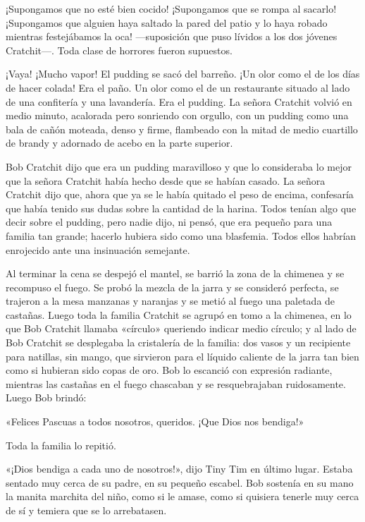 \documentclass{novela}
\begin{document}
 ¡Supongamos que no esté bien cocido! ¡Supongamos que se rompa al sacarlo! ¡Supongamos que alguien haya saltado la pared del patio y lo haya robado mientras festejábamos la oca! ---suposición que puso lívidos a los dos jóvenes Cratchit---. Toda clase de horrores fueron supuestos.

 ¡Vaya! ¡Mucho vapor! El pudding se sacó del barreño. ¡Un olor como el de los días de hacer colada! Era el paño. Un olor como el de un restaurante situado al lado de una confitería y una lavandería. Era el pudding. La señora Cratchit volvió en medio minuto, acalorada pero sonriendo con orgullo, con un pudding como una bala de cañón moteada, denso y firme, flambeado con la mitad de medio cuartillo de brandy y adornado de acebo en la parte superior.

 Bob Cratchit dijo que era un pudding maravilloso y que lo consideraba lo mejor que la señora Cratchit había hecho desde que se habían casado. La señora Cratchit dijo que, ahora que ya se le había quitado el peso de encima, confesaría que había tenido sus dudas sobre la cantidad de la harina. Todos tenían algo que decir sobre el pudding, pero nadie dijo, ni pensó, que era pequeño para una familia tan grande; hacerlo hubiera sido como una blasfemia. Todos ellos habrían enrojecido ante una insinuación semejante.

 Al terminar la cena se despejó el mantel, se barrió la zona de la chimenea y se recompuso el fuego. Se probó la mezcla de la jarra y se consideró perfecta, se trajeron a la mesa manzanas y naranjas y se metió al fuego una paletada de castañas. Luego toda la familia Cratchit se agrupó en tomo a la chimenea, en lo que Bob Cratchit llamaba «círculo» queriendo indicar medio círculo; y al lado de Bob Cratchit se desplegaba la cristalería de la familia: dos vasos y un recipiente para natillas, sin mango, que sirvieron para el líquido caliente de la jarra tan bien como si hubieran sido copas de oro. Bob lo escanció con expresión radiante, mientras las castañas en el fuego chascaban y se resquebrajaban ruidosamente. Luego Bob brindó:

 «Felices Pascuas a todos nosotros, queridos. ¡Que Dios nos bendiga!»

 Toda la familia lo repitió.

 «¡Dios bendiga a cada uno de nosotros!», dijo Tiny Tim en último lugar. Estaba sentado muy cerca de su padre, en su pequeño escabel. Bob sostenía en su mano la manita marchita del niño, como si le amase, como si quisiera tenerle muy cerca de sí y temiera que se lo arrebatasen.
\end{document}
